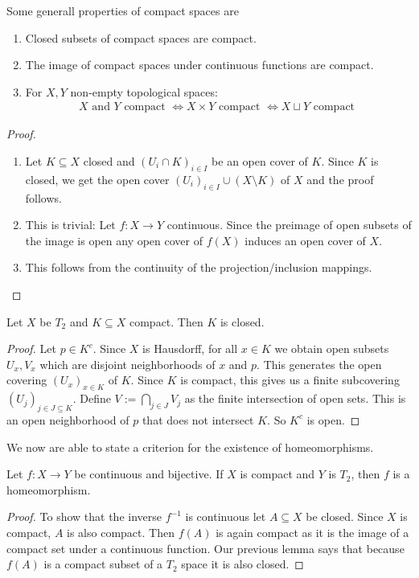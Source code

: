 Some generall properties of compact spaces are
\begin{enumerate}
  \item Closed subsets of compact spaces are compact. 
  \item The image of compact spaces under continuous functions are compact.
  \item For $X,Y$ non-empty topological spaces:
    \begin{align*}
      X \text{ and } Y \text{ compact } \iff X \times Y \text{ compact } \iff X \sqcup Y \text{ compact }
    \end{align*}
\end{enumerate}
\begin{proof}
  \begin{enumerate}
    \item Let $K \subseteq X$ closed and $\left(U_{i} \cap K\right)_{i \in I}$ be an open cover of $K$. 
      Since $K$ is closed, we get the open cover $\left(U_{i}\right)_{i\in I} \cup (X \setminus K)$ of $X$ and the proof follows.
    \item This is trivial: Let $f: X \to Y$ continuous.
      Since the preimage of open subsets of the image is open any open cover of $f(X)$ induces an open cover of $X$.
    \item This follows from the continuity of the projection/inclusion mappings.
  \end{enumerate}
\end{proof}

\begin{lem}[]
Let $X$ be $T_2$ and $K \subseteq X$ compact. Then $K$ is closed.
\end{lem}
\begin{proof}
  Let $p \in K^{c}$. Since $X$ is Hausdorff, for all $x \in K$ we obtain open subsets $U_x,V_x$ which are disjoint neighborhoods of $x$ and $p$.
  This generates the open covering $(U_x)_{x \in K}$ of $K$.
  Since $K$ is compact, this gives us a finite subcovering $(U_j)_{j \in J \subseteq K}$.
  Define $V := \bigcap_{j \in J}V_j$ as the finite intersection of open sets.
  This is an open neighborhood of $p$ that does not intersect $K$. So $K^{c}$ is open.
\end{proof}


We now are able to state a criterion for the existence of homeomorphisms.
\begin{thm}
Let $f: X \to Y$ be continuous and bijective.
If $X$ is compact and $Y$ is $T_2$, then $f$ is a homeomorphism.
\end{thm}
\begin{proof}
  To show that the inverse $f^{-1}$ is continuous let $A \subseteq X$ be closed.
  Since $X$ is compact, $A$ is also compact. 
  Then $f(A)$ is again compact as it is the image of a compact set under a continuous function.
  Our previous lemma says that because $f(A)$ is a compact subset of a $T_2$ space it is also closed.
\end{proof}

